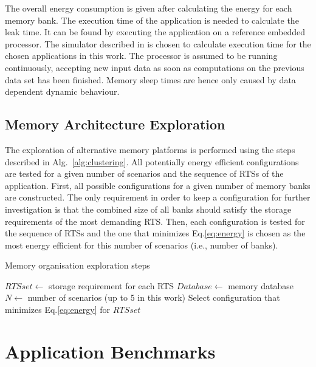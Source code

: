 \documentclass[smallextended]{svjour3}
\begin{document}
The overall energy consumption is given after calculating the energy for each memory bank. 
The execution time of the application is needed to calculate the leak time. 
It can be found by executing the application on a reference embedded processor. 
The simulator described in \cite{Gem5} is chosen to calculate execution time for the chosen applications in this work. 
The processor is assumed to be running continuously, accepting new input data as soon as computations on the previous data set has been finished. 
Memory sleep times are hence only caused by data dependent dynamic behaviour.

\subsection{Memory Architecture Exploration}

The exploration of alternative memory platforms is performed using the steps described in Alg.~\ref{alg:clustering}. 
All potentially energy efficient configurations are tested for a given number of scenarios and the sequence of RTSs of the application. 
First, all possible configurations for a given number of memory banks are constructed. 
The only requirement in order to keep a configuration for further investigation is that the combined size of all banks should satisfy the storage requirements of the most demanding RTS. 
Then, each configuration is tested for the sequence of RTSs and the one that minimizes Eq.\ref{eq:energy} is chosen as the most energy efficient for this number of scenarios (i.e., number of banks). 

\begin{algorithm}
\caption{Memory organisation exploration steps}
 \label{alg:clustering}
 \begin{algorithmic}[1]
		\STATE $RTSset \gets$ storage requirement for each RTS
		\STATE $Database \gets $ memory database
		\STATE $N \gets $ number of scenarios (up to 5 in this work)
				  \ENDIF
				\STATE Select configuration that minimizes Eq.\ref{eq:energy} for $RTSset$			
				\ENDFOR			
			\ENDFOR
 \end{algorithmic}
\end{algorithm}
 
\section{Application Benchmarks}
\label{sec:applications}
\end{document}

